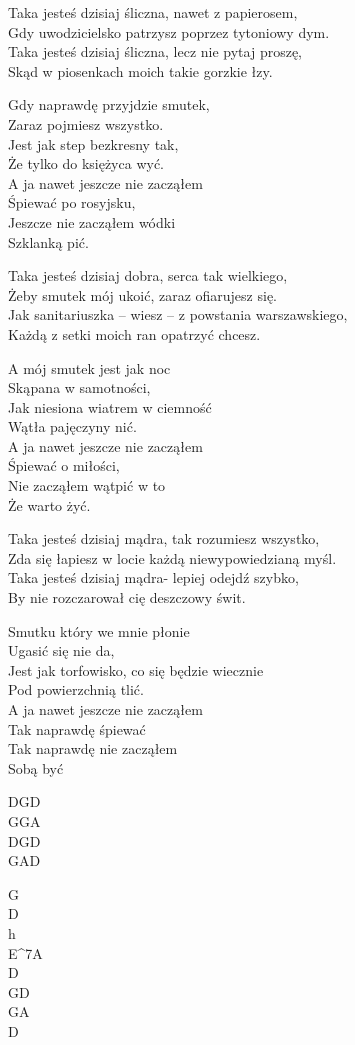\begin{text}
Taka jesteś dzisiaj śliczna, nawet z papierosem,\\
Gdy uwodzicielsko patrzysz poprzez tytoniowy dym.\\
Taka jesteś dzisiaj śliczna, lecz nie pytaj proszę,\\
Skąd w piosenkach moich takie gorzkie łzy.

\vin Gdy naprawdę przyjdzie smutek,\\
\vin Zaraz pojmiesz wszystko.\\
\vin Jest jak step bezkresny tak,\\
\vin Że tylko do księżyca wyć.\\
\vin A ja nawet jeszcze nie zacząłem\\
\vin Śpiewać po rosyjsku,\\
\vin Jeszcze nie zacząłem wódki\\
\vin Szklanką pić.

Taka jesteś dzisiaj dobra, serca tak wielkiego,\\
Żeby smutek mój ukoić, zaraz ofiarujesz się.\\
Jak sanitariuszka – wiesz – z powstania warszawskiego,\\
Każdą z setki moich ran opatrzyć chcesz.

\vin A mój smutek jest jak noc\\
\vin Skąpana w samotności,\\
\vin Jak niesiona wiatrem w ciemność\\
\vin Wątła pajęczyny nić.\\
\vin A ja nawet jeszcze nie zacząłem\\
\vin Śpiewać o miłości,\\
\vin Nie zacząłem wątpić w to\\
\vin Że warto żyć.

Taka jesteś dzisiaj mądra, tak rozumiesz wszystko,\\
Zda się łapiesz w locie każdą niewypowiedzianą myśl.\\
Taka jesteś dzisiaj mądra- lepiej odejdź szybko,\\
By nie rozczarował cię deszczowy świt.

\vin Smutku który we mnie płonie\\
\vin Ugasić się nie da,\\
\vin Jest jak torfowisko, co się będzie wiecznie\\
\vin Pod powierzchnią tlić.\\
\vin A ja nawet jeszcze nie zacząłem\\
\vin Tak naprawdę śpiewać\\
\vin Tak naprawdę nie zacząłem\\
\vin Sobą być
\end{text}
\begin{chord}
DGD\\
GGA\\
DGD\\
GAD

G\\
D\\
h\\
E^7A\\
D\\
GD\\
GA\\
D
\end{chord}